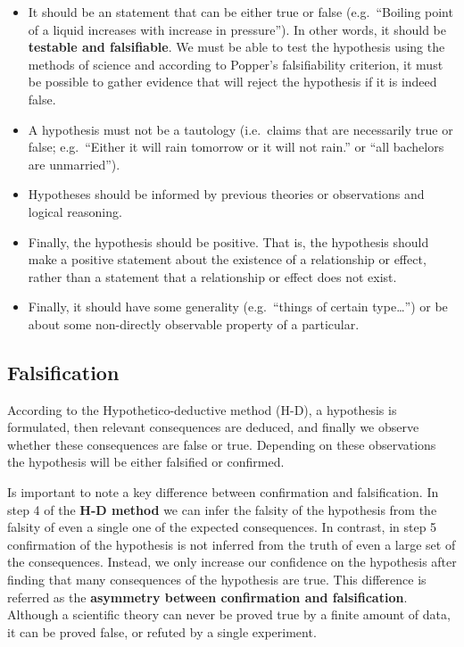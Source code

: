 \documentclass[
]{book}
\begin{document}
\begin{itemize}
\item
  It should be an statement that can be either true or false (e.g.~``Boiling point of a liquid increases with increase in pressure''). In other words, it should be \textbf{testable and falsifiable}. We must be able to test the hypothesis using the methods of science and according to Popper's falsifiability criterion, it must be possible to gather evidence that will reject the hypothesis if it is indeed false.
\item
  A hypothesis must not be a tautology (i.e.~claims that are necessarily true or false; e.g.~``Either it will rain tomorrow or it will not rain.'' or ``all bachelors are unmarried'').
\item
  Hypotheses should be informed by previous theories or observations and logical reasoning.
\item
  Finally, the hypothesis should be positive. That is, the hypothesis should make a positive statement about the existence of a relationship or effect, rather than a statement that a relationship or effect does not exist.
\item
  Finally, it should have some generality (e.g.~``things of certain type\ldots{}'') or be about some non-directly observable property of a particular.
\end{itemize}

\hypertarget{falsification}{%
\subsection{Falsification}\label{falsification}}

According to the Hypothetico-deductive method (H-D), a hypothesis is formulated, then relevant consequences are deduced, and finally we observe whether these consequences are false or true. Depending on these observations the hypothesis will be either falsified or confirmed.

Is important to note a key difference between confirmation and falsification. In step 4 of the \textbf{H-D method} we can infer the falsity of the hypothesis from the falsity of even a single one of the expected consequences. In contrast, in step 5 confirmation of the hypothesis is not inferred from the truth of even a large set of the consequences. Instead, we only increase our confidence on the hypothesis after finding that many consequences of the hypothesis are true. This difference is referred as the \textbf{asymmetry between confirmation and falsification}. Although a scientific theory can never be proved true by a finite amount of data, it can be proved false, or refuted by a single experiment.
\end{document}
